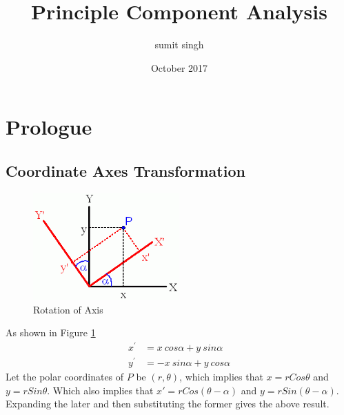 \documentclass[12pt,a4paper]{report}
\title{Principle Component Analysis}
\author{sumit singh}
\date{October 2017}
\begin{document}
\maketitle
\section{Prologue}
\subsection{Coordinate Axes Transformation}
\begin{figure}[h] \label{Fig:AxisRotation}
\centering
\includegraphics[width = 0.5\textwidth]{SVM/SVMImages/rot_2d_1.png} 
\caption{Rotation of Axis}
\end{figure}
As shown in Figure \ref{Fig:AxisRotation} \\
\begin{align*}
x^{'} &= x \ cos \alpha + y \ sin \alpha \\
y^{'} &= -x \ sin \alpha + y \ cos \alpha 
\end{align*}
Let the polar coordinates of $P$ be $(r,\theta)$, which implies that $x = r Cos\theta $ and $y = r Sin \theta$. Which also implies that $x' = r Cos(\theta -\alpha ) $ and $y = r Sin (\theta - \alpha)$. Expanding the later and then substituting the former gives the above result. \\
\end{document}
